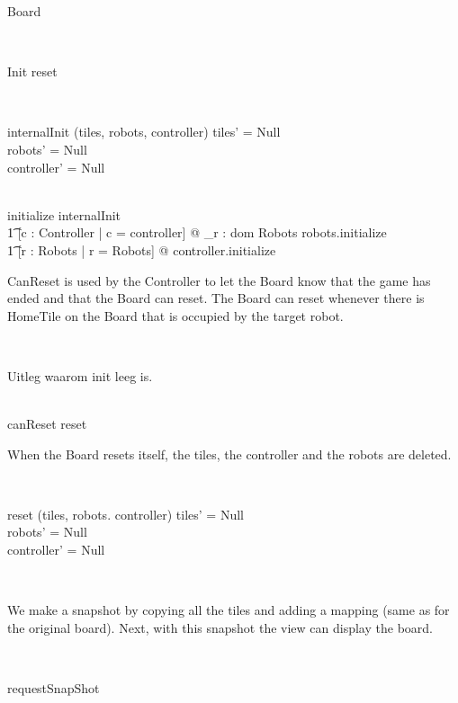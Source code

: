 \begin{class}{Board}
\begin{classcom}
\end{classcom} \\
\begin{schema}{Init}
reset
\end{schema} \\
\begin{schema}{internalInit}
\Delta (tiles, robots, controller)
\where
tiles' \not = Null \\
robots' \not = Null \\
controller' \not = Null
\end{schema} \\
initialize \sdef internalInit \; \comp \\ \t1
[c : Controller | c = controller] @ \bigwedge_{r : dom Robots} robots.initialize \; \comp \\ \t1
[r : \power Robots | r = \dom Robots] @ controller.initialize \\
\znewpage
\begin{classcom}
CanReset is used by the Controller to let the Board know that the game has ended and that the Board can reset. The Board can reset whenever there is HomeTile on the Board that is occupied by the target robot.
\end{classcom} \\
\begin{classcom}
Uitleg waarom init leeg is.
\end{classcom} \\
canReset \sdef [\exists t : \ran tiles | t \in HomeTileTiles @ \\
\t1 t.target = t.occupier] \wedge reset \\
\begin{classcom}
When the Board resets itself, the tiles, the controller and the robots are deleted.
\end{classcom} \\
\begin{schema}{reset}
\Delta (tiles, robots. controller)
\where
tiles' = Null \\
robots' = Null \\
controller' = Null
\end{schema} \\
\begin{classcom}
We make a snapshot by copying all the tiles and adding a mapping (same as for the original board). Next, with this snapshot the view can display the board.
\end{classcom} \\
\begin{schema}{requestSnapShot}

\end{schema}
\end{class}
